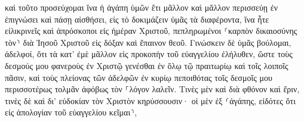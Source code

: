 \documentclass{openreader}
\begin{document}
καὶ τοῦτο προσεύχομαι ἵνα ἡ ἀγάπη ὑμῶν ἔτι μᾶλλον καὶ μᾶλλον περισσεύῃ ἐν ἐπιγνώσει καὶ πάσῃ αἰσθήσει, 
εἰς τὸ δοκιμάζειν ὑμᾶς τὰ διαφέροντα, ἵνα ἦτε εἰλικρινεῖς καὶ ἀπρόσκοποι εἰς ἡμέραν Χριστοῦ, 
πεπληρωμένοι ⸂καρπὸν δικαιοσύνης τὸν⸃ διὰ Ἰησοῦ Χριστοῦ εἰς δόξαν καὶ ἔπαινον θεοῦ. 
Γινώσκειν δὲ ὑμᾶς βούλομαι, ἀδελφοί, ὅτι τὰ κατ’ ἐμὲ μᾶλλον εἰς προκοπὴν τοῦ εὐαγγελίου ἐλήλυθεν, 
ὥστε τοὺς δεσμούς μου φανεροὺς ἐν Χριστῷ γενέσθαι ἐν ὅλῳ τῷ πραιτωρίῳ καὶ τοῖς λοιποῖς πᾶσιν, 
καὶ τοὺς πλείονας τῶν ἀδελφῶν ἐν κυρίῳ πεποιθότας τοῖς δεσμοῖς μου περισσοτέρως τολμᾶν ἀφόβως τὸν ⸀λόγον λαλεῖν. 
Τινὲς μὲν καὶ διὰ φθόνον καὶ ἔριν, τινὲς δὲ καὶ δι’ εὐδοκίαν τὸν Χριστὸν κηρύσσουσιν· 
οἱ μὲν ἐξ ⸂ἀγάπης, εἰδότες ὅτι εἰς ἀπολογίαν τοῦ εὐαγγελίου κεῖμαι⸃, 
\end{document}
